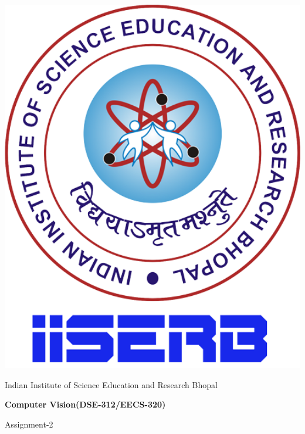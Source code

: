 \documentclass[12pt, a4paper]{exam}
\begin{document}
	\noindent
	\begin{minipage}[l]{0.1\textwidth}
		\noindent
		\includegraphics[width=1.8\textwidth]{imgs/iiserb_logo.png}
	\end{minipage}
\hfill
\begin{minipage}[c]{0.8\textwidth}
	\begin{center}
		{\large	Indian Institute of Science Education and Research Bhopal \par
		\large	\par
	\large \textbf{	Computer Vision(DSE-312/EECS-320)}	\par
\small	Assignment-2}
	\end{center}
\end{minipage}
\end{document}
